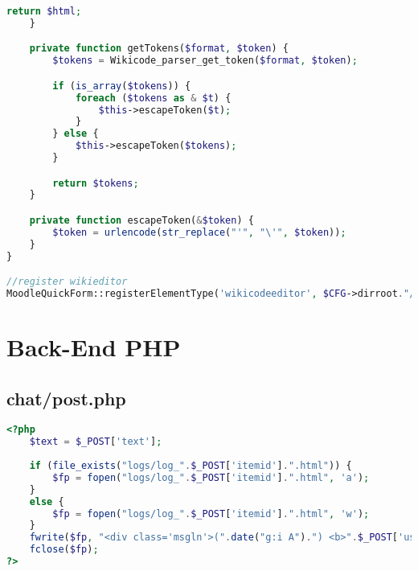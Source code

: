 \begin{lstlisting}[language=PHP]
        return $html;
    }

    private function getTokens($format, $token) {
        $tokens = Wikicode_parser_get_token($format, $token);

        if (is_array($tokens)) {
            foreach ($tokens as & $t) {
                $this->escapeToken($t);
            }
        } else {
            $this->escapeToken($tokens);
        }

        return $tokens;
    }

    private function escapeToken(&$token) {
        $token = urlencode(str_replace("'", "\'", $token));
    }
}

//register wikieditor
MoodleQuickForm::registerElementType('wikicodeeditor', $CFG->dirroot."/mod/wikicode/editors/wikieditor.php", 'MoodleQuickForm_Wikieditor');
\end{lstlisting}

\section{Back-End PHP}

\subsection{chat/post.php}
\begin{lstlisting}[language=PHP]
<?php
	$text = $_POST['text'];
	
	if (file_exists("logs/log_".$_POST['itemid'].".html")) {
		$fp = fopen("logs/log_".$_POST['itemid'].".html", 'a');
	}
	else {
		$fp = fopen("logs/log_".$_POST['itemid'].".html", 'w');
	}
	fwrite($fp, "<div class='msgln'>(".date("g:i A").") <b>".$_POST['user']."</b>: ".stripslashes(htmlspecialchars($text))."<br></div>");
	fclose($fp);
?>
\end{lstlisting}


